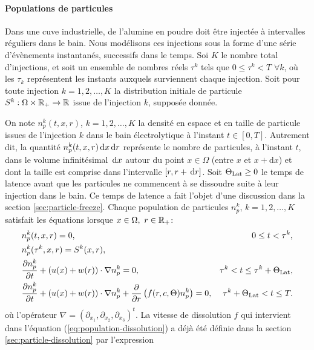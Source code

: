 \paragraph{Populations de particules}
Dans une cuve industrielle, de l'alumine en poudre doit être injectée
à intervalles réguliers dans le bain. Nous modélisons ces injections
sous la forme d'une série d'évènements instantanés, successifs dans le
temps. Soi $K$ le nombre total d'injections, et soit un ensemble de
nombres réels $\tau^k$ tels que $0\leq \tau^k < T$ $\forall k$, où
les $\tau_k$ représentent les
instants auxquels surviennent chaque injection. Soit pour toute
injection $k = 1,2, \dots, K$ la distribution initiale de particule
$S^k:\Omega\times\mathbb R_+\to\mathbb R$ issue de l'injection $k$,
supposée donnée.

On note $n_p^k(t, x, r)$, $k = 1, 2, \dots, K$ la densité en espace et
en taille de particule issues de l'injection $k$ dans le bain
électrolytique à l'instant $t \in [0, T]$. Autrement dit, la quantité
$n_p^k(t, x, r)\,\mathrm dx\,\mathrm dr$ représente le nombre de particules, à
l'instant $t$, dans le volume infinitésimal $\,\mathrm dx$ autour du point
$x\in\Omega$ (entre $x$ et $x + \mathrm dx$) et dont la taille est comprise dans l'intervalle $[r,
  r+\,\mathrm dr]$. Soit $\Theta_\text{Lat} \geq 0$ le temps de latence avant que les
particules ne commencent à se dissoudre suite à leur injection dans le
bain. Ce temps de latence a fait l'objet d'une discussion dans la
section \ref{sec:particle-freeze}. Chaque population de particules
$n_p^k$, $k = 1, 2,\dots, K$ satisfait les
équations lorsque $x\in\Omega,\ r\in\rplus$:
\begin{align}
  &n_p^k(t, x, r) = 0, & 0\leq t < \tau^k,\label{eq:population-pre-injection}\\
  &n_p^k(\tau^k, x, r) = S^k(x, r),\label{eq:population-injection}\\
  &\frac{\partial n_p^k}{\partial t} + (u(x) + w(r))\cdot \nabla n_p^k
  = 0, &\tau^k < t \leq \tau^k +
  \Theta_\text{Lat},\label{eq:population-transport}\\
  &\frac{\partial n_p^k}{\partial t} + (u(x) + w(r))\cdot \nabla n_p^k
  + \frac{\partial}{\partial r} \left( f(r, c,
    \Theta) n_p^k \right) = 0, &\tau^k + \Theta_\text{Lat} < t \leq T.\label{eq:population-dissolution}
\end{align}
où l'opérateur $\nabla = (\partial_{x_1}, \partial_{x_2},
\partial_{x_3})^t$. La vitesse de dissolution $f$ qui intervient dans
l'équation (\ref{eq:population-dissolution}) a déjà été définie dans
la section \ref{sec:particle-dissolution} par l'expression

